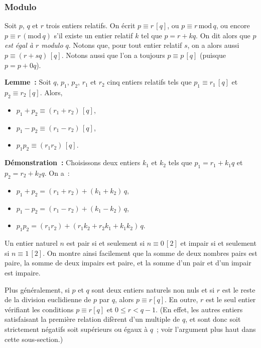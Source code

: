 \subsubsection{Modulo}

Soit $p$, $q$ et $r$ trois entiers relatifs. 
On écrit $p \equiv r \, [q]$, ou $p \equiv r \, \mathrm{mod} \, q$, ou encore $p \equiv r \, ( \mathrm{mod} \, q)$ s'il existe un entier relatif $k$ tel que $p = r + k q$.  
On dit alors que \textit{$p$ est égal à $r$ modulo $q$}.
Notons que, pour tout entier relatif $s$, on a alors aussi $p \equiv (r + s q) \, [q]$.
Notons aussi que l'on a toujours $p \equiv p \, [q]$ (puisque $p = p + 0 q$). 

\medskip 

\noindent\textbf{Lemme :} Soit $q$, $p_1$, $p_2$, $r_1$ et $r_2$ cinq entiers relatifs tels que $p_1 \equiv r_1 \, [q]$ et $p_2 \equiv r_2 \, [q]$.
Alors, 
\begin{itemize}[nosep]
    \item $p_1 + p_2 \equiv (r_1 + r_2) \, [q]$, 
    \item $p_1 - p_2 \equiv (r_1 - r_2) \, [q]$, 
    \item $p_1 p_2 \equiv (r_1 r_2) \, [q]$.
\end{itemize}

\medskip

\noindent\textbf{Démonstration :} Choisissons deux entiers $k_1$ et $k_2$ tels que $p_1 = r_1 + k_1 q$ et $p_2 = r_2 + k_2 q$. 
On a :
\begin{itemize}[nosep]
    \item $p_1 + p_2 = (r_1 + r_2) + (k_1 + k_2) \, q$, 
    \item $p_1 - p_2 = (r_1 - r_2) + (k_1 - k_2) \, q$, 
    \item $p_1 p_2 = (r_1 r_2) + (r_1 k_2 + r_2 k_1 + k_1 k_2) \, q$.
\end{itemize}

\done

\bigskip

Un entier naturel $n$ est pair si et seulement si $n \equiv 0 \, [2]$ et impair si et seulement si $n \equiv 1 \, [2]$. 
On montre ainsi facilement que la somme de deux nombres pairs est paire, la somme de deux impairs est paire, et la somme d'un pair et d'un impair est impaire.

Plus généralement, si $p$ et $q$ sont deux entiers naturels non nuls et si $r$ est le reste de la division euclidienne de $p$ par $q$, alors $p \equiv r [q]$. 
En outre, $r$ est le seul entier vérifiant les conditions $p \equiv r [q]$ et $0 \leq r < q-1$. 
(En effet, les autres entiers satisfaisant la première relation difèrent d'un multiple de $q$, et sont donc soit strictement négatifs soit supérieurs ou égaux à $q$ ; voir l'argument plus haut dans cette sous-section.)

